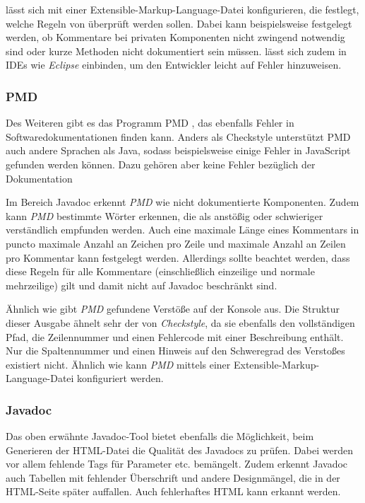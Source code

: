 			
\cs lässt sich mit einer Extensible-Markup-Language-Datei konfigurieren, die festlegt, welche Regeln von \cs überprüft werden sollen. Dabei kann beispielsweise festgelegt werden, ob Kommentare bei privaten Komponenten nicht zwingend notwendig sind oder kurze Methoden nicht dokumentiert sein müssen.
\cs lässt sich zudem in \ac{IDE}s wie \textit{Eclipse} einbinden, um den Entwickler leicht auf Fehler hinzuweisen. 
\subsubsection{PMD}
Des Weiteren gibt es das Programm PMD \cite{PMD}, das ebenfalls Fehler in Softwaredokumentationen finden kann.  Anders als Checkstyle unterstützt PMD auch andere Sprachen als Java, sodass beispielsweise einige Fehler in JavaScript gefunden werden können. Dazu gehören aber keine Fehler bezüglich der Dokumentation

Im Bereich  Javadoc erkennt \textit{PMD} wie \cs nicht dokumentierte Komponenten. Zudem kann \textit{PMD} bestimmte Wörter erkennen, die als anstößig oder schwieriger verständlich empfunden werden. Auch eine maximale Länge eines Kommentars in puncto maximale Anzahl an Zeichen pro Zeile und maximale Anzahl an Zeilen pro Kommentar kann festgelegt werden. Allerdings sollte beachtet werden, dass diese Regeln für alle Kommentare (einschließlich einzeilige und normale mehrzeilige) gilt und damit nicht auf Javadoc beschränkt sind. 

Ähnlich wie \cs gibt \textit{PMD} gefundene Verstöße auf der Konsole aus. Die Struktur dieser Ausgabe ähnelt sehr der von \textit{Checkstyle}, da sie ebenfalls den vollständigen Pfad, die Zeilennummer und einen Fehlercode mit einer Beschreibung enthält. Nur die Spaltennummer  und einen Hinweis auf den Schweregrad des Verstoßes existiert nicht. Ähnlich wie \cs kann \textit{PMD} mittels einer Extensible-Markup-Language-Datei konfiguriert werden.

\subsubsection{Javadoc}
Das oben erwähnte Javadoc-Tool bietet ebenfalls die Möglichkeit, beim Generieren der HTML-Datei die Qualität des Javadocs zu prüfen. Dabei werden vor allem fehlende Tags für Parameter etc. bemängelt. Zudem erkennt Javadoc auch Tabellen mit fehlender Überschrift und andere Designmängel, die in der \ac{HTML}-Seite später auffallen. Auch fehlerhaftes \ac{HTML} kann erkannt werden.

